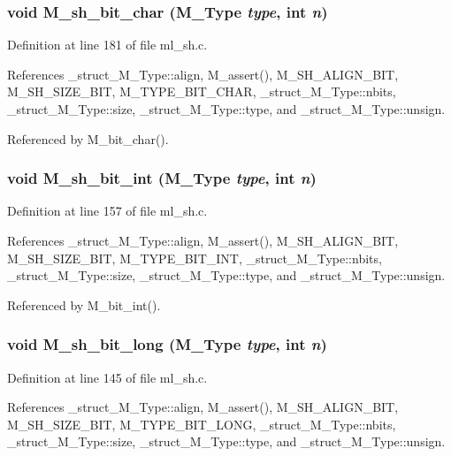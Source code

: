 \subsubsection{\setlength{\rightskip}{0pt plus 5cm}void M\_\-sh\_\-bit\_\-char (\bf{M\_\-Type} {\em type}, int {\em n})}\label{m__sh_8h_a7e1e7a635253b088f131522efb56442}




Definition at line 181 of file ml\_\-sh.c.

References \_\-struct\_\-M\_\-Type::align, M\_\-assert(), M\_\-SH\_\-ALIGN\_\-BIT, M\_\-SH\_\-SIZE\_\-BIT, M\_\-TYPE\_\-BIT\_\-CHAR, \_\-struct\_\-M\_\-Type::nbits, \_\-struct\_\-M\_\-Type::size, \_\-struct\_\-M\_\-Type::type, and \_\-struct\_\-M\_\-Type::unsign.

Referenced by M\_\-bit\_\-char().
\subsubsection{\setlength{\rightskip}{0pt plus 5cm}void M\_\-sh\_\-bit\_\-int (\bf{M\_\-Type} {\em type}, int {\em n})}\label{m__sh_8h_5b1c167235d1da910fe5061cdfc7c946}




Definition at line 157 of file ml\_\-sh.c.

References \_\-struct\_\-M\_\-Type::align, M\_\-assert(), M\_\-SH\_\-ALIGN\_\-BIT, M\_\-SH\_\-SIZE\_\-BIT, M\_\-TYPE\_\-BIT\_\-INT, \_\-struct\_\-M\_\-Type::nbits, \_\-struct\_\-M\_\-Type::size, \_\-struct\_\-M\_\-Type::type, and \_\-struct\_\-M\_\-Type::unsign.

Referenced by M\_\-bit\_\-int().
\subsubsection{\setlength{\rightskip}{0pt plus 5cm}void M\_\-sh\_\-bit\_\-long (\bf{M\_\-Type} {\em type}, int {\em n})}\label{m__sh_8h_63b5f196e1f41bda218a0aea42881c7e}




Definition at line 145 of file ml\_\-sh.c.

References \_\-struct\_\-M\_\-Type::align, M\_\-assert(), M\_\-SH\_\-ALIGN\_\-BIT, M\_\-SH\_\-SIZE\_\-BIT, M\_\-TYPE\_\-BIT\_\-LONG, \_\-struct\_\-M\_\-Type::nbits, \_\-struct\_\-M\_\-Type::size, \_\-struct\_\-M\_\-Type::type, and \_\-struct\_\-M\_\-Type::unsign.

